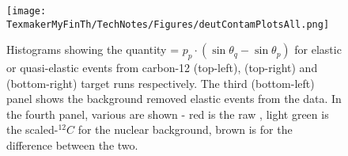 \begin{figure}[H]%
\centerline{\texttt{[image: TexmakerMyFinTh/TechNotes/Figures/deutContamPlotsAll.png]}}
\caption[\Delt = $p_{p}\cdot(\sin\theta_q - \sin\theta_{p})$ for quasi-elastic events]{Histograms showing the quantity \Delt = $p_{p}\cdot(\sin\theta_q - \sin\theta_{p})$ for elastic or quasi-elastic events from carbon-12 (top-left),  (top-right) and  (bottom-right) target runs respectively. The third (bottom-left) panel shows the background removed elastic events from the  data. In the fourth panel, various \Delts are shown - red is the raw , light green is the scaled-$^{12}C$ for the nuclear background, brown is for the difference between the two.
}
\label{fig:deutContAll}
\end{figure}






